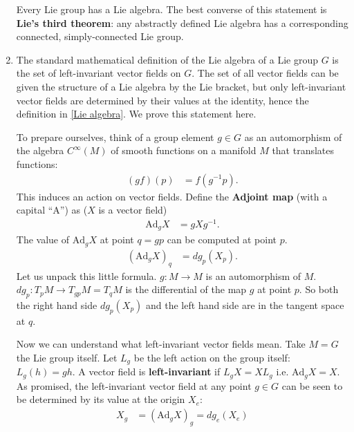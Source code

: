 \documentclass[aps,nofootinbib]{revtex4}
\begin{document}
\begin{enumerate}
Every Lie group has a Lie algebra. The best converse of this statement
is \textbf{Lie's third theorem}: any abstractly defined Lie algebra
has a corresponding connected, simply-connected Lie group.

\item \label{left-invariant vector field} The standard mathematical definition of the Lie algebra of a Lie group $G$ is the set of left-invariant vector fields on $G$. The
set of all vector fields can be given the structure of a Lie algebra
by the Lie bracket, but only left-invariant vector fields are determined
by their values at the identity, hence the definition in \ref{Lie algebra}. We prove
this statement here.

To prepare ourselves, think of a group element $g\in G$ as an automorphism
of the algebra $C^{\infty}(M)$ of smooth functions on a manifold $M$ that translates functions:
\begin{align*}
\left(gf\right)\left(p\right) & =f\left(g^{-1}p\right).
\end{align*}
This induces an action on vector fields. Define the \textbf{Adjoint
map }(with a capital ``A'') as ($X$ is a vector field)
\begin{align*}
\mbox{Ad}_{g}X & =gXg^{-1}.
\end{align*}
The value of $\mbox{Ad}_{g}X$ at point $q=gp$ can be computed at
point $p$.
\begin{align*}
\left(\mbox{Ad}_{g}X\right)_{q} & =dg_{p}\left(X_{p}\right).
\end{align*}
Let us unpack this little formula. $g:M\to M$ is an automorphism
of $M$. $dg_{p}:T_{p}M\to T_{gp}M=T_{q}M$ is the differential of
the map $g$ at point $p$. So both the right hand side $dg_{p}\left(X_{p}\right)$
and the left hand side are in the tangent space at $q$.

Now we can understand what left-invariant vector fields mean. Take $M=G$ the Lie group itself. Let $L_{g}$ be the left action on the group itself: $L_{g}\left(h\right)=gh$.
A vector field is \textbf{left-invariant }if $L_{g}X=XL_{g}$ i.e.
$\mbox{Ad}_{g}X=X$. As promised, the left-invariant vector field
at any point $g\in G$ can be seen to be determined by its value at the origin $X_{e}$:
\begin{align*}
X_{g} & =\left(\mbox{Ad}_{g}X\right)_{g}=dg_{e}\left(X_{e}\right)
\end{align*}



\end{enumerate}
\end{document}
